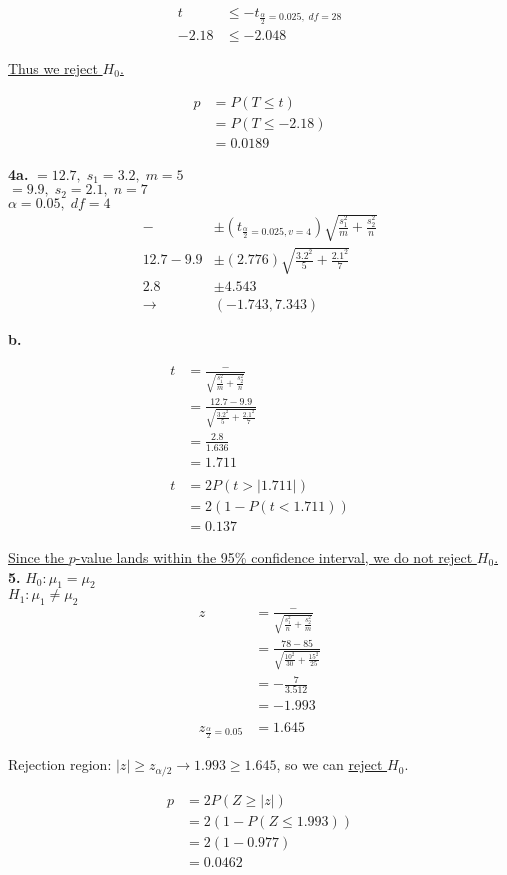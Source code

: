 \documentclass[12pt]{report}
\makeatletter
\newcommand*{\Xbar}{}%
\DeclareRobustCommand*{\Xbar}{%
	\mathpalette\@Xbar{}%
}
\newcommand*{\@Xbar}[2]{%
	\sbox0{$#1\mathrm{X}\m@th$}%
	\sbox2{$#1X\m@th$}%
	\rlap{%
		\hbox to\wd2{%
			\hfill
			$\overline{%
				\vrule width 0pt height\ht0 %
				\kern\wd0 %
			}$%
		}%
	}%
	\copy2 %
}
\newcommand*{\Ybar}{}%
\DeclareRobustCommand*{\Ybar}{%
	\mathpalette\@Ybar{}%
}
\newcommand*{\@Ybar}[2]{%
	\sbox0{$#1\mathrm{Y}\m@th$}%
	\sbox2{$#1Y\m@th$}%
	\rlap{%
		\hbox to\wd2{%
			\hfill
			$\overline{%
				\vrule width 0pt height\ht0 %
				\kern\wd0 %
			}$%
		}%
	}%
	\copy2 %
}
\makeatother
\begin{document}
\begin{align*}
	t &\leq -t_{\frac{\alpha}{2}=0.025,\;df=28} \\
	-2.18 &\leq -2.048
\end{align*}

\noindent \underline{Thus we reject $H_0$.}

\begin{align*}
	p &= P(T \leq t)\\
	&= P(T \leq -2.18)\\
	&= \boxed{0.0189}
\end{align*}

\noindent \textbf{4a.} $\Xbar = 12.7,\;s_1 = 3.2,\;m=5$\\
$\Ybar = 9.9,\;s_2=2.1,\;n=7$\\

\noindent $\alpha = 0.05,\; df = 4$\\

\begin{align*}
	\Xbar - \Ybar &\pm (t_{\frac{\alpha}{2}=0.025, v=4})\sqrt{\frac{s_1^2}{m} + \frac{s_2^2}{n}}\\
	12.7 - 9.9 &\pm (2.776)\sqrt{\frac{3.2^2}{5} + \frac{2.1^2}{7}}\\
	2.8 &\pm 4.543\\
	\rightarrow & \boxed{(-1.743, 7.343)}
\end{align*}

\noindent \textbf{b.} 

\begin{align*}
	t &= \frac{\Xbar - \Ybar}{\sqrt{\frac{s_1^2}{m} + \frac{s_2^2}{n}}}\\
	&= \frac{12.7 - 9.9}{\sqrt{\frac{3.2^2}{5} + \frac{2.1^2}{7}}}\\
	&= \frac{2.8}{1.636}\\
	&= \boxed{1.711}\\\\
	t &= 2P(t > |1.711|)\\
	&= 2(1 - P(t < 1.711))\\
	&= \boxed{0.137}
\end{align*}

\noindent \underline{Since the $p$-value lands within the 95\% confidence interval, we do not reject $H_0$.}\\

\noindent \textbf{5.} $H_0 : \mu_1 = \mu_2$\\
$H_1 : \mu_1 \neq \mu_2$
\begin{align*}
	z &= \frac{\Xbar - \Ybar}{\sqrt{\frac{s_1^2}{n} + \frac{s_2^2}{m}}}\\
	&= \frac{78-85}{\sqrt{\frac{10^2}{30} + \frac{15^2}{25}}}\\
	&= -\frac{7}{3.512}\\
	&= \boxed{-1.993}\\\\
	z_{\frac{\alpha}{2} = 0.05} &= 1.645
\end{align*}

\noindent Rejection region: $|z| \geq z_{\alpha/2} \rightarrow 1.993 \geq 1.645$, so we can \underline{reject $H_0$}.

\begin{align*}
	p &= 2P(Z \geq |z|)\\
	&= 2(1 - P(Z \leq 1.993))\\
	&= 2(1 - 0.977)\\
	&= \boxed{0.0462}
\end{align*}
\end{document}
